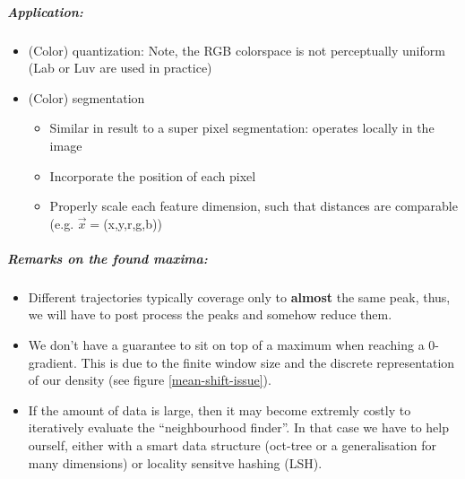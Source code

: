 \subparagraph{Application:}
\begin{itemize}
  \item (Color) quantization: Note, the RGB colorspace is not perceptually uniform (Lab or Luv are used in practice)
  \item (Color) segmentation
    \begin{itemize}
      \item Similar in result to a super pixel segmentation: operates locally in the image
      \item Incorporate the position of each pixel
      \item Properly scale each feature dimension, such that distances are comparable (e.g. $\vec{x} = $(x,y,r,g,b))
    \end{itemize}
\end{itemize}

\subparagraph{Remarks on the found maxima:}
\begin{itemize}
  \item Different trajectories typically coverage only to \textbf{almost} the same peak, thus, we will have to post process the peaks and somehow reduce them.
  \item We don't have a guarantee to sit on top of a maximum when reaching a 0-gradient. This is due to the finite window size and the discrete representation of our density (see figure \ref{mean-shift-issue}).
  \item \label{mean-shift-cost-effectiveness} If the amount of data is large, then it may become extremly costly to iteratively evaluate the ``neighbourhood finder''. In that case we have to help ourself, either with a smart data structure (oct-tree or a generalisation for many dimensions) or locality sensitve hashing (LSH).
\end{itemize}
